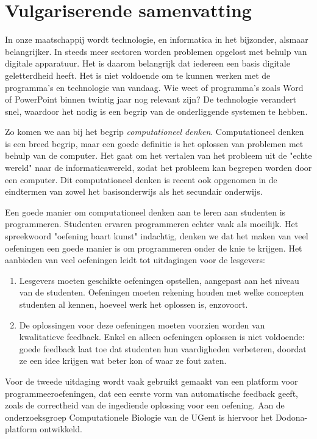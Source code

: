 \chapter*{Vulgariserende samenvatting}

In onze maatschappij wordt technologie, en informatica in het bijzonder, alsmaar belangrijker.
In steeds meer sectoren worden problemen opgelost met behulp van digitale apparatuur.
Het is daarom belangrijk dat iedereen een basis digitale geletterdheid heeft.
Het is niet voldoende om te kunnen werken met de programma's en technologie van vandaag.
Wie weet of programma's zoals Word of PowerPoint binnen twintig jaar nog relevant zijn?
De technologie verandert snel, waardoor het nodig is een begrip van de onderliggende systemen te hebben.

Zo komen we aan bij het begrip \emph{computationeel denken}.
Computationeel denken is een breed begrip, maar een goede definitie is het oplossen van problemen met behulp van de computer.
Het gaat om het vertalen van het probleem uit de "echte wereld" naar de informaticawereld, zodat het probleem kan begrepen worden door een computer.
Dit computationeel denken is recent ook opgenomen in de eindtermen van zowel het basisonderwijs als het secundair onderwijs.

Een goede manier om computationeel denken aan te leren aan studenten is programmeren.
Studenten ervaren programmeren echter vaak als moeilijk.
Het spreekwoord "oefening baart kunst" indachtig, denken we dat het maken van veel oefeningen een goede manier is om programmeren onder de knie te krijgen.
Het aanbieden van veel oefeningen leidt tot uitdagingen voor de lesgevers:

\begin{enumerate}
    \item Lesgevers moeten geschikte oefeningen opstellen, aangepast aan het niveau van de studenten.
    Oefeningen moeten rekening houden met welke concepten studenten al kennen, hoeveel werk het oplossen is, enzovoort.
    \item De oplossingen voor deze oefeningen moeten voorzien worden van kwalitatieve feedback.
    Enkel en alleen oefeningen oplossen is niet voldoende: goede feedback laat toe dat studenten hun vaardigheden verbeteren, doordat ze een idee krijgen wat beter kon of waar ze fout zaten.
\end{enumerate}

Voor de tweede uitdaging wordt vaak gebruikt gemaakt van een platform voor programmeeroefeningen, dat een eerste vorm van automatische feedback geeft, zoals de correctheid van de ingediende oplossing voor een oefening.
Aan de onderzoeksgroep Computationele Biologie van de UGent is hiervoor het Dodona-platform ontwikkeld.

